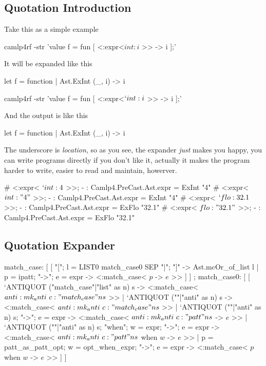 \subsection{Quotation Introduction}
Take this as a simple example

\begin{bashcode}
camlp4rf -str 'value f = fun [ <:expr<$int:i$ >> -> i ];'
\end{bashcode}
It will be expanded like this

\begin{ocamlcode}
let f = function | Ast.ExInt (_, i) -> i
\end{ocamlcode}

\begin{bashcode}
camlp4rf -str 'value f = fun [ <:expr<$`int:i$ >> -> i ];'
\end{bashcode}

And the output is like this

\begin{ocamlcode}
let f = function | Ast.ExInt (_, i) -> i
\end{ocamlcode}

The underscore is \textit{location}, so as you see, the expander
\textit{just} makes you happy, you can write programs directly if you
don't like it, actually it makes the program harder to write, easier
to read and maintain, howerver.

\begin{ocamlcode}
# <:expr< $`int:4$ >>;
- : Camlp4.PreCast.Ast.expr = ExInt  "4"
# <:expr< $int:"4"$ >>;
- : Camlp4.PreCast.Ast.expr = ExInt  "4"
# <:expr< $`flo:32.1$ >>;
- : Camlp4.PreCast.Ast.expr = ExFlo  "32.1"
# <:expr< $flo:"32.1"$ >>;
- : Camlp4.PreCast.Ast.expr = ExFlo  "32.1"
\end{ocamlcode}

\subsection{Quotation Expander}

\begin{ocamlcode}
    match_case:
      [ [ "["; l = LIST0 match_case0 SEP "|"; "]" -> Ast.mcOr_of_list l
        | p = ipatt; "->"; e = expr -> <:match_case< $p$ -> $e$ >> ] ]
    ;
    match_case0:
      [ [ `ANTIQUOT ("match_case"|"list" as n) s ->
            <:match_case< $anti:mk_anti ~c:"match_case" n s$ >>
        | `ANTIQUOT (""|"anti" as n) s ->
            <:match_case< $anti:mk_anti ~c:"match_case" n s$ >>
        | `ANTIQUOT (""|"anti" as n) s; "->"; e = expr ->
            <:match_case< $anti:mk_anti ~c:"patt" n s$ -> $e$ >>
        | `ANTIQUOT (""|"anti" as n) s; "when"; w = expr; "->"; e = expr ->
            <:match_case< $anti:mk_anti ~c:"patt" n s$ when $w$ -> $e$ >>
        | p = patt_as_patt_opt; w = opt_when_expr; "->"; e = expr -> <:match_case< $p$ when $w$ -> $e$ >>
      ] ]
\end{ocamlcode}
    
